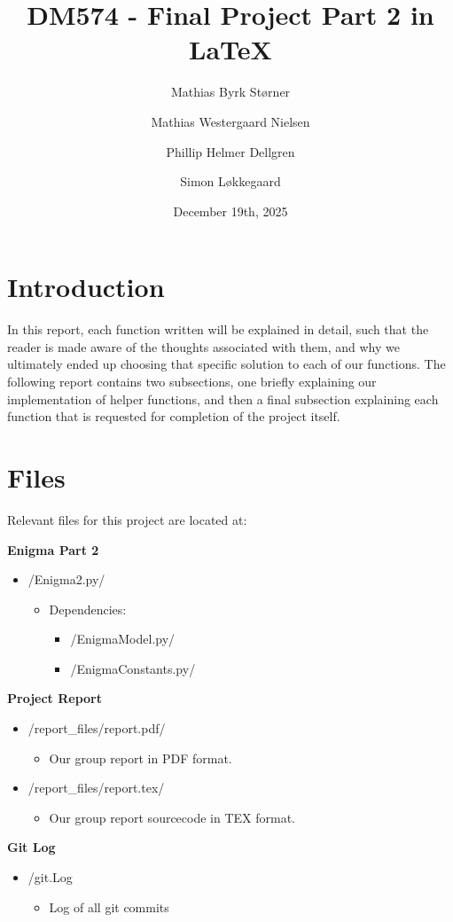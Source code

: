 \documentclass{article}
\title{DM574 - Final Project Part 2 in \LaTeX}
\author[1]{Mathias Byrk Størner}
\author[1]{Mathias Westergaard Nielsen}
\author[1]{Phillip Helmer Dellgren}
\author[1]{Simon Løkkegaard}
\affil[1]{Computer Science (Datalogi), University of Southern Denmark}
\date{December 19th, 2025}
\begin{document}
\maketitle

\section{Introduction}
In this report, each function written will be explained in detail, such that the reader is made aware of the thoughts associated with them,
and why we ultimately ended up choosing that specific solution to each of our functions. The following report contains two subsections, one briefly explaining
our implementation of helper functions, and then a final subsection explaining each function that is requested for completion of the project itself.

\pagebreak

\section{Files}
Relevant files for this project are located at:

\textbf{Enigma Part 2}
\begin{itemize}
    \item /Enigma2.py/
    \begin{itemize}
        \item Dependencies:
        \begin{itemize}
            \item /EnigmaModel.py/
            \item /EnigmaConstants.py/
        \end{itemize}
    \end{itemize}
\end{itemize}

\textbf{Project Report}
\begin{itemize}
    \item /report\_files/report.pdf/
    \begin{itemize}
        \item Our group report in PDF format.
    \end{itemize}
    \item /report\_files/report.tex/
    \begin{itemize}
        \item Our group report sourcecode in TEX format.
    \end{itemize}
\end{itemize}
\textbf{Git Log}
\begin{itemize}
    \item /git.Log 
    \begin{itemize}
        \item Log of all git commits
    \end{itemize}
\end{itemize}
\end{document}
